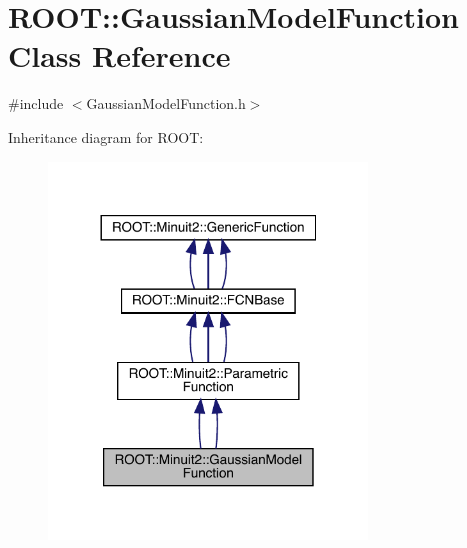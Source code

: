\hypertarget{classROOT_1_1Minuit2_1_1GaussianModelFunction}{}\section{R\+O\+OT\+:\+:Gaussian\+Model\+Function Class Reference}
\label{classROOT_1_1Minuit2_1_1GaussianModelFunction}


{\ttfamily \#include $<$Gaussian\+Model\+Function.\+h$>$}



Inheritance diagram for R\+O\+OT\+:
\nopagebreak
\begin{figure}[H]
\begin{center}
\leavevmode
\includegraphics[width=240pt]{d1/da2/classROOT_1_1Minuit2_1_1GaussianModelFunction__inherit__graph}
\end{center}
\end{figure}



